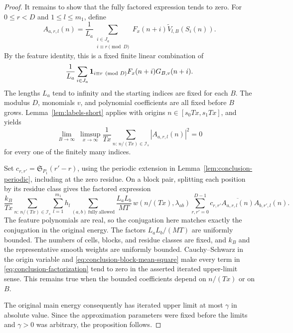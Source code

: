 \begin{proof}
It remains to show that the fully factored expression tends to zero.
For $0\le r<D$ and $1\le l\le m_1$, define
\[
 A_{a,r,l}(n)
   =\frac1{L_a}
       \sum_{\substack{i\in J_a\\i\equiv r\pmod D}}
          F_x(n+i)\widetilde V_{l,B}(S_i(n)).
\]
By the feature identity, this is a fixed finite linear combination of
\[
 \frac1{L_a}\sum_{i\in J_a}
       \mathbf 1_{i\equiv r\pmod D}F_x(n+i)G_{B,v}(n+i).
\]
The lengths $L_a$ tend to infinity and the starting indices are fixed
for each $B$.  The modulus $D$, monomials $v$, and polynomial
coefficients are all fixed before $B$ grows.  Lemma~\ref{lem:labels-short}
applies with origins
$n\in[s_0Tx,s_1Tx]$, and yields
\begin{equation}
 \lim_{B\to\infty}\ \limsup_{x\to\infty}
    \frac1{Tx}\sum_{n:\,n/(Tx)\in\mathcal I_s}
                   |A_{a,r,l}(n)|^2=0
 \label{eq:conclusion-block-mean-square}
\end{equation}
for every one of the finitely many indices.

Set $c_{r,r'}=\mathfrak S_{P_1}(r'-r)$, using the periodic extension
in Lemma~\ref{lem:conclusion-periodic}, including at the zero residue.
On a block pair, splitting each position by its residue class gives
the factored expression
\begin{equation}
 \frac{k_B}{Tx}
   \sum_{n:\,n/(Tx)\in\mathcal I_s}
   \sum_{l=1}^{m_1}h_l
   \sum_{(a,b)\ \mathrm{fully\ allowed}}
      \frac{L_aL_b}{MT}\,w(n/(Tx),\lambda_{ab})
      \sum_{r,r'=0}^{D-1}c_{r,r'}
            \overline{A_{a,r,l}(n)}A_{b,r',l}(n).
 \label{eq:conclusion-factorization}
\end{equation}
The feature polynomials are real, so the conjugation here matches
exactly the conjugation in the original energy.  The factors
$L_aL_b/(MT)$ are uniformly bounded.  The numbers of cells, blocks,
and residue classes are fixed, and $k_B$ and the representative smooth
weights are uniformly bounded.  Cauchy--Schwarz in the origin variable
and \eqref{eq:conclusion-block-mean-square} make every term in
\eqref{eq:conclusion-factorization} tend to zero in the asserted
iterated upper-limit sense.  This remains true when the bounded
coefficients depend on $n/(Tx)$ or on $B$.

The original main energy consequently has iterated upper limit at
most $\gamma$ in absolute value.  Since the approximation parameters
were fixed before the limits and $\gamma>0$ was arbitrary, the
proposition follows.
\end{proof}

